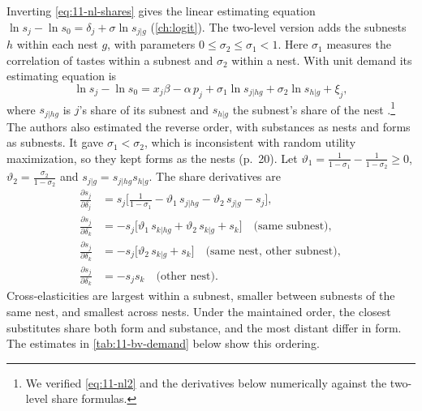 Inverting \eqref{eq:11-nl-shares} gives the linear estimating equation
$\ln s_j-\ln s_0=\delta_j+\sigma\ln s_{j|g}$ (\cref{ch:logit}). The two-level version adds the subnests $h$ within
each nest $g$, with parameters $0\le\sigma_2\le\sigma_1<1$. Here $\sigma_1$ measures the correlation of tastes
within a subnest and $\sigma_2$ within a nest. With unit demand its estimating equation is
\begin{equation}\label{eq:11-nl2}
\ln s_j-\ln s_0=x_j\beta-\alpha\,p_j+\sigma_1\ln s_{j|hg}+\sigma_2\ln s_{h|g}+\xi_j,
\end{equation}
where $s_{j|hg}$ is $j$'s share of its subnest and $s_{h|g}$ the subnest's share of the nest
\citep[eq.~(9)]{Verboven1996,BjornerstedtVerboven2013}.\footnote{We verified \eqref{eq:11-nl2} and the derivatives
below numerically against the two-level share formulas.} The authors also estimated the reverse order, with
substances as nests and forms as subnests. It gave $\sigma_1<\sigma_2$, which is inconsistent with random utility
maximization, so they kept forms as the nests (p.~20). Let $\vartheta_1=\frac{1}{1-\sigma_1}-\frac{1}{1-\sigma_2}\ge0$,
$\vartheta_2=\frac{\sigma_2}{1-\sigma_2}$ and $s_{j|g}=s_{j|hg}s_{h|g}$. The share derivatives are
\begin{align*}
\frac{\partial s_j}{\partial\delta_j}&=s_j\Big[\frac{1}{1-\sigma_1}-\vartheta_1\,s_{j|hg}-\vartheta_2\,s_{j|g}-s_j\Big],\\
\frac{\partial s_j}{\partial\delta_k}&=-s_j\big[\vartheta_1\,s_{k|hg}+\vartheta_2\,s_{k|g}+s_k\big]\quad\text{(same subnest)},\\
\frac{\partial s_j}{\partial\delta_k}&=-s_j\big[\vartheta_2\,s_{k|g}+s_k\big]\quad\text{(same nest, other subnest)},\\
\frac{\partial s_j}{\partial\delta_k}&=-s_js_k\quad\text{(other nest)}.
\end{align*}
Cross-elasticities are largest within a subnest, smaller between subnests of the same nest, and smallest across
nests. Under the maintained order, the closest substitutes share both form and substance, and the most distant
differ in form. The estimates in \cref{tab:11-bv-demand} below show this ordering.

